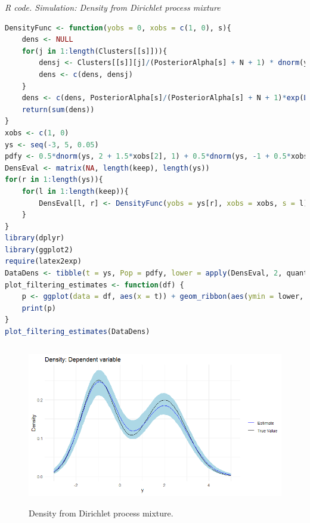 \begin{enumerate}[leftmargin=*]
\begin{tcolorbox}[enhanced,width=4.67in,center upper,
	fontupper=\large\bfseries,drop shadow southwest,sharp corners]
	\textit{R code. Simulation: Density from Dirichlet process mixture}
	\begin{VF}
		\begin{lstlisting}[language=R]
DensityFunc <- function(yobs = 0, xobs = c(1, 0), s){
	dens <- NULL
	for(j in 1:length(Clusters[[s]])){
		densj <- Clusters[[s]][j]/(PosteriorAlpha[s] + N + 1) * dnorm(yobs, t(PosteriorBeta[[s]][,j])%*%xobs, PosteriorSigma[[s]][j]) 
		dens <- c(dens, densj)
	}
	dens <- c(dens, PosteriorAlpha[s]/(PosteriorAlpha[s] + N + 1)*exp(LogMarLikLM(yh = yobs, xh = xobs)))
	return(sum(dens))
}
xobs <- c(1, 0)
ys <- seq(-3, 5, 0.05)
pdfy <- 0.5*dnorm(ys, 2 + 1.5*xobs[2], 1) + 0.5*dnorm(ys, -1 + 0.5*xobs[2], 0.8)
DensEval <- matrix(NA, length(keep), length(ys))
for(r in 1:length(ys)){
	for(l in 1:length(keep)){
		DensEval[l, r] <- DensityFunc(yobs = ys[r], xobs = xobs, s = l)
	}
}
library(dplyr)
library(ggplot2)
require(latex2exp)
DataDens <- tibble(t = ys, Pop = pdfy, lower = apply(DensEval, 2, quantile, probs = 0.025), upper = apply(DensEval, 2, quantile, probs = 0.975), meanT = colMeans(DensEval))
plot_filtering_estimates <- function(df) {
	p <- ggplot(data = df, aes(x = t)) + geom_ribbon(aes(ymin = lower, ymax = upper), alpha = 1, fill = "lightblue") + geom_line(aes(y = Pop, color = "True Value"), linewidth = 0.5) + geom_line(aes(y = meanT, color = "Estimate"), linewidth = 0.5) + scale_color_manual(values = c("True Value" = "black", "Estimate" = "blue")) + xlab(TeX("y")) + ylab("Density") +	labs(title = "Density: Dependent variable", color = "") + theme_minimal()
	print(p)
}
plot_filtering_estimates(DataDens)
\end{lstlisting}
	\end{VF}
\end{tcolorbox}

\begin{figure}[!h]
	\includegraphics[width=340pt, height=200pt]{Chapters/chapter11/figures/DensityDPM.png}
	\caption[List of figure caption goes here]{Density from Dirichlet process mixture.}\label{figDensityDPM}
\end{figure}



\end{enumerate}
